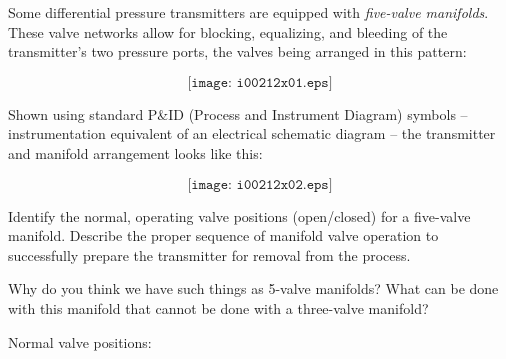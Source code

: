 

Some differential pressure transmitters are equipped with {\it five-valve manifolds}.  These valve networks allow for blocking, equalizing, and bleeding of the transmitter's two pressure ports, the valves being arranged in this pattern:

$$\texttt{[image: i00212x01.eps]}$$

Shown using standard P\&ID (Process and Instrument Diagram) symbols -- instrumentation equivalent of an electrical schematic diagram -- the transmitter and manifold arrangement looks like this:

$$\texttt{[image: i00212x02.eps]}$$

Identify the normal, operating valve positions (open/closed) for a five-valve manifold.  Describe the proper sequence of manifold valve operation to successfully prepare the transmitter for removal from the process.

\vskip 10pt

Why do you think we have such things as 5-valve manifolds?  What can be done with this manifold that cannot be done with a three-valve manifold?







Normal valve positions:

